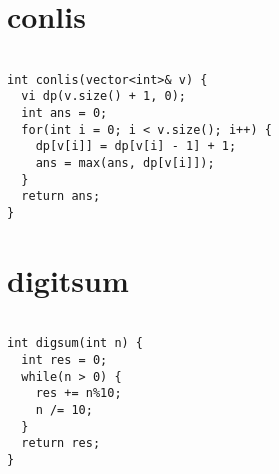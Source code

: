 \documentclass[a4j,titlepage]{jarticle} %
\begin{document}
\color{white}
\section{conlis}
\color{black}
\begin{lstlisting}[caption=conlis]

int conlis(vector<int>& v) {
  vi dp(v.size() + 1, 0);
  int ans = 0;
  for(int i = 0; i < v.size(); i++) {
    dp[v[i]] = dp[v[i] - 1] + 1;
    ans = max(ans, dp[v[i]]);
  }
  return ans;
}

\end{lstlisting}

\color{white}
\section{digitsum}
\color{black}
\begin{lstlisting}[caption=digitsum]

int digsum(int n) {
  int res = 0;
  while(n > 0) {
    res += n%10;
    n /= 10;
  }
  return res;
}

\end{lstlisting}

\color{white}
\end{document}
